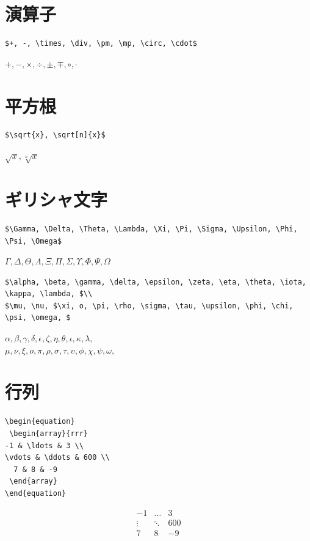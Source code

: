 \documentclass[a4j,openany,11px]{jsbook}
\begin{document}
\section{演算子}
\begin{verbatim}
$+, -, \times, \div, \pm, \mp, \circ, \cdot$
\end{verbatim}
$+, -, \times, \div, \pm, \mp, \circ, \cdot$

\section{平方根}
\begin{verbatim}
$\sqrt{x}, \sqrt[n]{x}$
\end{verbatim}
$\sqrt{x}, \sqrt[n]{x}$

\section{ギリシャ文字}
\begin{verbatim}
$\Gamma, \Delta, \Theta, \Lambda, \Xi, \Pi, \Sigma, \Upsilon, \Phi, \Psi, \Omega$
\end{verbatim}
$\Gamma, \Delta, \Theta, \Lambda, \Xi, \Pi, \Sigma, \Upsilon, \Phi, \Psi, \Omega$

\begin{verbatim}
$\alpha, \beta, \gamma, \delta, \epsilon, \zeta, \eta, \theta, \iota, \kappa, \lambda, $\\
$\mu, \nu, $\xi, o, \pi, \rho, \sigma, \tau, \upsilon, \phi, \chi, \psi, \omega, $
\end{verbatim}
$\alpha, \beta, \gamma, \delta, \epsilon, \zeta, \eta, \theta, \iota, \kappa, \lambda, $\\
$\mu, \nu, \xi, o, \pi, \rho, \sigma, \tau, \upsilon, \phi, \chi, \psi, \omega, $
\section{行列}
\begin{verbatim}
\begin{equation}
 \begin{array}{rrr}
-1 & \ldots & 3 \\
\vdots & \ddots & 600 \\
  7 & 8 & -9
 \end{array}
\end{equation}
\end{verbatim}

\begin{equation}
\begin{array}{rrr}
-1 & \ldots & 3 \\
\vdots & \ddots & 600 \\
7 & 8 & -9
\end{array}
\end{equation}
\end{document}
